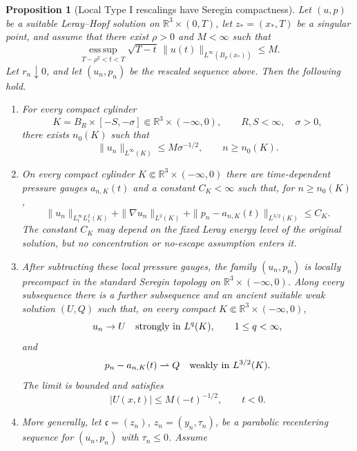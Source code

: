 \documentclass[11pt]{amsart}
\numberwithin{equation}{section}
\theoremstyle{plain}
\newtheorem{proposition}[proposition]{Proposition}
\theoremstyle{definition}
\theoremstyle{remark}
\newcommand{\R}{\mathbb R}
\newcommand{\esssup}{\operatorname*{ess\,sup}}
\begin{document}
\begin{proposition}[Local Type I rescalings have Seregin compactness]
\label{prop:local-typeI-terminal-compactness}
Let \((u,p)\) be a suitable Leray--Hopf solution on
\(\R^3\times(0,T)\), let \(z_*=(x_*,T)\) be a singular point, and assume that
there exist \(\rho>0\) and \(M<\infty\) such that
\begin{equation}\label{eq:local-typeI-implication-bound}
   \esssup_{T-\rho^2<t<T}
   \sqrt{T-t}\,\|u(t)\|_{L^\infty(B_\rho(x_*))}\le M .
\end{equation}
Let \(r_n\downarrow0\), and let \((u_n,p_n)\) be the rescaled sequence above.
Then the following hold.
\begin{enumerate}[label=\textup{(\roman*)}]
\item For every compact cylinder
\[
   K=B_R\times[-S,-\sigma]\Subset\R^3\times(-\infty,0),
   \qquad R,S<\infty,\quad \sigma>0,
\]
there exists \(n_0(K)\) such that
\begin{equation}\label{eq:local-typeI-implication-unifLinfty}
   \|u_n\|_{L^\infty(K)}\le M\sigma^{-1/2},
   \qquad n\ge n_0(K).
\end{equation}
\item On every compact cylinder \(K\Subset\R^3\times(-\infty,0)\) there are
time-dependent pressure gauges \(a_{n,K}(t)\) and a constant \(C_K<\infty\)
such that, for \(n\ge n_0(K)\),
\begin{equation}\label{eq:local-typeI-implication-local-bounds}
   \|u_n\|_{L^\infty_tL^2_x(K)}
   +\|\nabla u_n\|_{L^2(K)}
   +\|p_n-a_{n,K}(t)\|_{L^{3/2}(K)}
   \le C_K .
\end{equation}
The constant \(C_K\) may depend on the fixed Leray energy level of the original
solution, but no concentration or no-escape assumption enters it.
\item After subtracting these local pressure gauges, the family
\((u_n,p_n)\) is locally precompact in the standard Seregin topology on
\(\R^3\times(-\infty,0)\).  Along every subsequence there is a further
subsequence and an ancient suitable weak solution \((U,Q)\) such that, on
every compact \(K\Subset\R^3\times(-\infty,0)\),
\[
   u_n\to U\quad\hbox{strongly in }L^q(K),\qquad 1\le q<\infty,
\]
and
\[
   p_n-a_{n,K}(t)\rightharpoonup Q
   \quad\hbox{weakly in }L^{3/2}(K).
\]
The limit is bounded and satisfies
\[
   |U(x,t)|\le M(-t)^{-1/2},\qquad t<0.
\]
\item More generally, let \(\mathfrak c=(z_n)\), \(z_n=(y_n,\tau_n)\), be a
parabolic recentering sequence for \((u_n,p_n)\) with \(\tau_n\le0\).  Assume

\end{enumerate}
\end{proposition}
\end{document}
